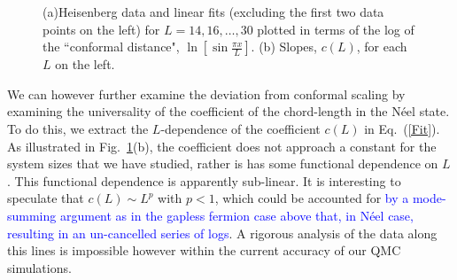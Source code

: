 \documentclass[prl,aps,twocolumn,floatfix,amsmath,amssymb,superscriptaddress,tightenlines]{revtex4}
\begin{document}
 \begin{figure}
   \begin{center}
   \end{center}
   \caption{(a)Heisenberg data and linear fits (excluding the first two data points on the left) for $L=14,16,\dots,30$ plotted in terms of the log of the ``conformal distance", $\ln\left[\sin \frac{\pi x}{L}\right]$.
   (b) Slopes, $c(L)$, for each $L$ on the left.
   }
   \label{fig:heis_lines}
 \end{figure}

We can however further examine the deviation from conformal scaling by examining the universality of the 
coefficient of the chord-length in the N\'eel state.
To do this, we extract the $L$-dependence of the coefficient $c(L)$ in Eq.~(\ref{Fit}).  As illustrated in Fig.~\ref{fig:heis_lines}(b),
the coefficient does not approach a constant for the system sizes that we have studied, rather is has some functional dependence on $L$.
This functional dependence is apparently sub-linear.  It is interesting to speculate that $c(L) \sim L^p$ with $p<1$,
which could be accounted for \textcolor{blue}{by a mode-summing argument as in the gapless fermion case above that, in N\'eel case, 
resulting in an un-cancelled series of logs}.  A rigorous analysis of the data along this lines is impossible however within the current
accuracy of our QMC simulations.
\end{document}
